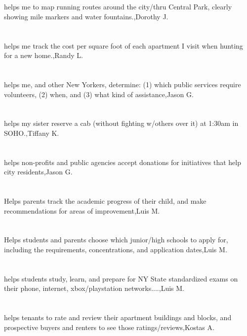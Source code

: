 \section{}helps me to map running routes around the city/thru Central Park, clearly showing mile markers and water fountains.,Dorothy J.	
\section{}helps me track the cost per square foot of each apartment I visit when hunting for a new home.,Randy L.	
\section{}helps me, and other New Yorkers, determine: (1) which public services require volunteers, (2) when, and (3) what kind of assistance,Jason G.	
\section{}helps my sister reserve a cab (without fighting w/others over it) at 1:30am in SOHO.,Tiffany K.	
\section{}helps non-profits and public agencies accept donations for initiatives that help city residents,Jason G.	
\section{}Helps parents track the academic progress of their child, and make recommendations for areas of improvement,Luis M.	
\section{}Helps students and parents choose which junior/high schools to apply for, including the requirements, concentrations, and application dates,Luis M.	
\section{}helps students study, learn, and prepare for NY State standardized exams on their phone, internet, xbox/playstation networks....,Luis M.	
\section{}helps tenants to rate and review their apartment buildings and blocks, and prospective buyers and renters to see those ratings/reviews,Kostas A.	
